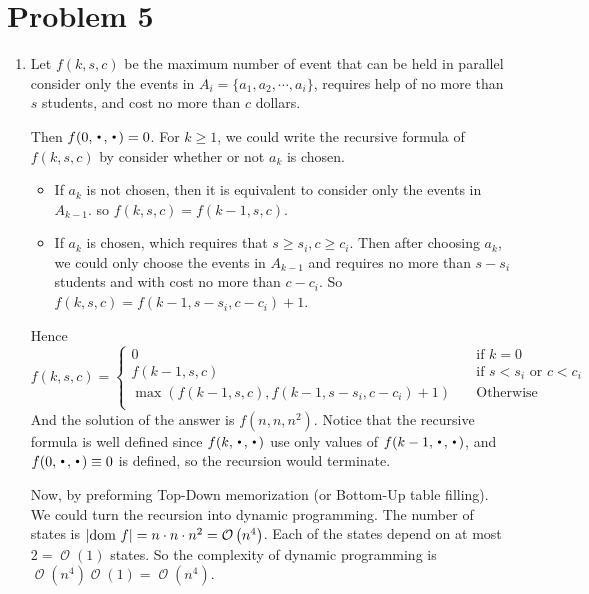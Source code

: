 \documentclass[12pt, a4paper]{article}
\DeclarePairedDelimiter{\abs}{\lvert}{\rvert}
\DeclareMathOperator*{\Bigcdot}{\scalerel*{\cdot}{\bigodot}}
\newcommand{\opord}{\operatorname{\mathcal{O}}}
\newcommand{\ord}[1]{\opord\left(#1\right)}
\begin{document}
\section{Problem 5}
\begin{enumerate}
  \item Let $f(k, s, c)$ be the maximum number of event that can be held in parallel 
    consider only the events in $A_i = \{a_1, a_2, \cdots, a_i\}$, requires help of no more than 
    $s$ students, and cost no more than $c$ dollars.

    Then $f(0, \Bigcdot, \Bigcdot) = 0$. For $k \geq 1$, we could write the recursive 
    formula of $f(k, s, c)$ by consider whether or not $a_k$ is chosen.
    \begin{itemize}
      \item If $a_k$ is not chosen, then it is equivalent to consider only the events in $A_{k-1}$.
        so $f(k, s, c) = f(k-1, s, c)$.
      \item If $a_k$ is chosen, which requires that $s \geq s_i, c \geq c_i$.
        Then after choosing $a_k$, we could only choose the events in $A_{k-1}$ and 
        requires no more than $s-s_i$ students and with cost no more than $c-c_i$.
        So $f(k, s, c) = f(k-1, s-s_i, c-c_i) + 1$.
    \end{itemize}
    Hence 
    \[
      f(k, s, c) = 
      \begin{cases}
        0 & \quad \text{if } k = 0 \\
        f(k-1, s, c) & \quad \text{if } s < s_i \text{ or } c < c_i \\
        \max\left( f(k-1, s, c), f(k-1, s-s_i, c-c_i)+1 \right) & \quad \text{Otherwise } \\
      \end{cases}
    \]
    And the solution of the answer is $f(n, n, n^2)$.
    Notice that the recursive formula is well defined since $f(k, \Bigcdot, \Bigcdot)$ use 
    only values of $f(k-1, \Bigcdot, \Bigcdot)$, and $f(0, \Bigcdot, \Bigcdot) \equiv 0$ is defined, 
    so the recursion would terminate.

    Now, by preforming Top-Down memorization (or Bottom-Up table filling). We could turn the
    recursion into dynamic programming. The number of states is $\abs{\text{dom } f} = n \cdot n \cdot n^2 = \ord{n^4}$.
    Each of the states depend on at most $2 = \ord{1}$ states. So the complexity of
    dynamic programming is $\ord{n^4} \ord{1} = \ord{n^4}$.


\end{enumerate}
\end{document}
